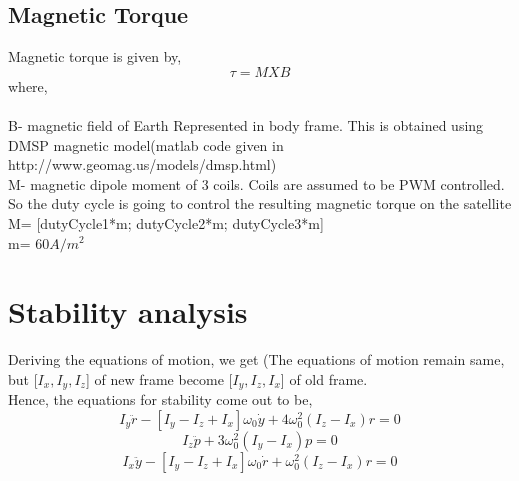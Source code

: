 \documentclass[10pt,a4paper]{report}
\begin{document}
\section{Magnetic Torque}

Magnetic torque is given by,
\begin{equation}
\tau=M X B
\end{equation}
where,\\ \\
B- magnetic field of Earth Represented in body frame. This is obtained using DMSP magnetic model(matlab code given in http://www.geomag.us/models/dmsp.html)\\ 
M- magnetic dipole moment of 3 coils.
Coils are assumed to be PWM controlled. So the duty cycle is going to control the resulting magnetic torque on the satellite \\
M= [dutyCycle1*m; dutyCycle2*m; dutyCycle3*m]\\
m= $60A/m^2$


\chapter{Stability analysis}
Deriving the equations of motion, we get (The equations of motion remain same, but [$I_{x},I_{y},I_{z}$] of new frame become [$I_{y},I_{z},I_{x}$] of old frame.\\
Hence, the equations for stability come out to be,
\begin{equation}
I_{y}\ddot{r}-[I_{y}-I_{z}+I_{x}]\omega_{0}\dot{y}+4\omega_{0}^{2}(I_{z}-I_{x})r=0
\end{equation}
\begin{equation}
I_{z}\ddot{p}+3\omega_{0}^{2}(I_{y}-I_{x})p=0
\end{equation}
\begin{equation}
I_{x}\ddot{y}-[I_{y}-I_{z}+I_{x}]\omega_{0}\dot{r}+\omega_{0}^{2}(I_{z}-I_{x})r=0
\end{equation}
\end{document}
